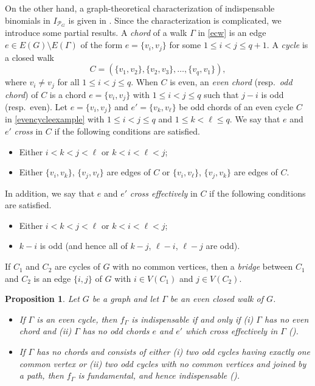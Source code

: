 \documentclass[10pt,a4paper]{amsart}
\newtheorem{prop}[thm]{Proposition}
\numberwithin{thm}{section}
\numberwithin{equation}{section}
\def\epoly{{\mathcal P}_G}
\begin{document}
On the other hand, a graph-theoretical characterization of indispensable binomials in $I_{\epoly}$ is given in \cite[Theorem 4.14]{RTT}.
Since the characterization is complicated, we introduce some partial results.
A {\em chord} of a walk $\Gamma$ in \eqref{ecw} is an edge $e \in E(G) \setminus E(\Gamma)$ of the form $e=\{v_i,v_j\}$ for some $1 \le i < j \le q+1$.
A {\it cycle} is a closed walk 
\begin{equation} \label{evencycleexample}    
    C =(\{v_1,v_2\}, \{v_2,v_3\}, \dots,\{v_q,v_{1}\}),
    \end{equation}
where $v_i \ne v_j$ for all $1 \le i < j \le q$.
When $C$ is even, an {\em even chord} (resp.~{\em odd chord}) of $C$ is a chord $e=\{v_i,v_j\}$
with $1 \le i < j \le q$ such that $j-i$ is odd (resp.~even).
Let $e=\{v_i,v_j\}$ and $e'=\{v_k,v_\ell\}$ be odd chords of an even cycle $C$ in \eqref{evencycleexample}
with $1 \le i < j \le q$ and $1 \le k < \ell \le q$.
We say that $e$ and $e'$ {\em cross} in $C$ if the following conditions are satisfied.
\begin{itemize}
    \item 
    Either $i < k < j < \ell$ or $k < i < \ell < j$; 
    \item 
    Either $\{v_i,v_k\}$, $\{v_j,v_\ell\}$ are edges of $C$
or $\{v_i,v_\ell\}$, $\{v_j,v_k\}$ are edges of $C$.
\end{itemize}
In addition, we say that $e$ and $e'$ {\em cross effectively} in $C$ if the following conditions are satisfied.
\begin{itemize}
    \item 
    Either $i < k < j < \ell$ or $k < i < \ell < j$; 
    \item 
    $k-i$ is odd (and hence all of $k-j$, $\ell-i$, $\ell -j$ are odd).
\end{itemize}
If $C_1$ and $C_2$ are cycles of $G$ with no common vertices, then a {\em bridge} between $C_1$ and $C_2$ is an edge $\{i,j\}$ of $G$ with $i \in V(C_1)$ and $j \in V(C_2)$.

\begin{prop} \label{ep:indispensable}
Let $G$ be a graph and let $\Gamma$ be an even closed walk of $G$.
\begin{itemize}
    \item[(a)] 
    If $\Gamma$ is an even cycle, then $f_\Gamma$ is indispensable
if and only if {\rm (i)} $\Gamma$ has no even chord and {\rm (ii)} $\Gamma$ has no odd chords $e$ and $e'$ which
cross effectively in $\Gamma$ {\rm (}\cite[Theorem 2.3]{OHindispensable}{\rm )}.
\item[(b)]
If $\Gamma$ has no chords and consists of either {\rm (i)} two odd cycles having exactly one common vertex or
{\rm (ii)} two odd cycles with no common vertices and joined by a path, then $f_\Gamma$ is fundamental, and hence indispensable
 {\rm (}\cite[Theorem 2.2]{RTT}{\rm )}.
\end{itemize}
\end{prop}
\end{document}
